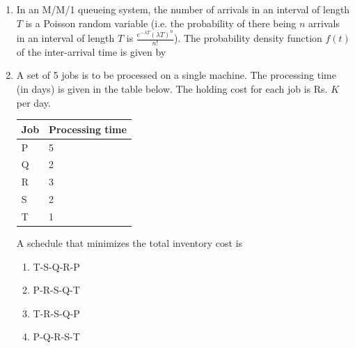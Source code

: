 \documentclass[journal,12pt,onecolumn]{IEEEtran}
\begin{document}
\begin{enumerate}
    \item In an M/M/1 queueing system, the number of arrivals in an interval of length $T$ is a Poisson random variable (i.e. the probability of there being $n$ arrivals in an interval of length $T$ is $\frac{e^{-\lambda T}(\lambda T)^n}{n!}$). The probability density function $f(t)$ of the inter-arrival time is given by

          \begin{enumerate}
          \end{enumerate}

    \item A set of 5 jobs is to be processed on a single machine. The processing time (in days) is given in the table below. The holding cost for each job is Rs. $K$ per day.
          \begin{table}[H]
              \centering\large
              \begin{tabular}{|l|l|}
                  \hline
                  \textbf{Job} & \textbf{Processing time} \\
                  \hline
                  P            & 5                        \\\hline
                  Q            & 2                        \\\hline
                  R            & 3                        \\\hline
                  S            & 2                        \\\hline
                  T            & 1                        \\\hline
              \end{tabular}
              \label{q18}
          \end{table}
          A schedule that minimizes the total inventory cost is

          \begin{enumerate}
              \item T-S-Q-R-P
              \item P-R-S-Q-T
              \item T-R-S-Q-P
              \item P-Q-R-S-T
          \end{enumerate}


\end{enumerate}
\end{document}
